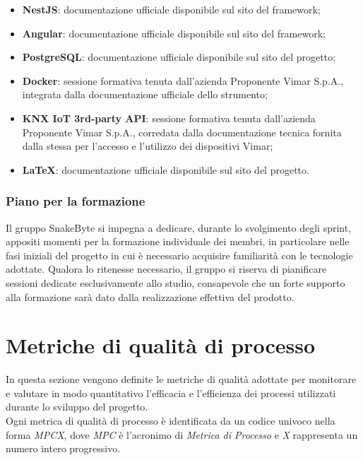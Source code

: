 \documentclass[10pt, letterpaper]{article}
\begin{document}
\begin{itemize}
    \item \textbf{NestJS}: documentazione ufficiale disponibile 
    sul sito del framework;
    \item \textbf{Angular}: documentazione ufficiale disponibile 
    sul sito del framework;
    \item \textbf{PostgreSQL}: documentazione ufficiale disponibile 
    sul sito del progetto;
    \item \textbf{Docker}: sessione formativa tenuta dall'azienda 
    Proponente Vimar S.p.A., integrata dalla documentazione 
    ufficiale dello strumento;
    \item \textbf{KNX IoT 3rd-party API}: sessione formativa tenuta 
    dall'azienda Proponente Vimar S.p.A., corredata dalla 
    documentazione tecnica fornita dalla stessa per l'accesso 
    e l'utilizzo dei dispositivi Vimar;
    \item \textbf{\LaTeX}: documentazione ufficiale disponibile 
    sul sito del progetto.
\end{itemize}

\subsubsection{Piano per la formazione}
Il gruppo SnakeByte si impegna a dedicare, durante lo svolgimento 
degli sprint, appositi momenti per la formazione individuale dei 
membri, in particolare nelle fasi iniziali del progetto in cui 
è necessario acquisire familiarità con le tecnologie adottate. 
Qualora lo ritenesse necessario, il gruppo si riserva di pianificare 
sessioni dedicate esclusivamente allo studio, consapevole che 
un forte supporto alla formazione sarà dato dalla realizzazione 
effettiva del prodotto.

\section{Metriche di qualità di processo}
\label{sec:MetricheProcesso}
In questa sezione vengono definite le metriche di qualità adottate per monitorare
e valutare in modo quantitativo l'efficacia e l'efficienza dei processi utilizzati
durante lo sviluppo del progetto.
\\ Ogni metrica di qualità di processo è identificata
da un codice univoco nella forma \textit{MPCX}, dove \textit{MPC} è l'acronimo di \textit{Metrica di Processo} e \textit{X} rappresenta
un numero intero progressivo.
\end{document}
